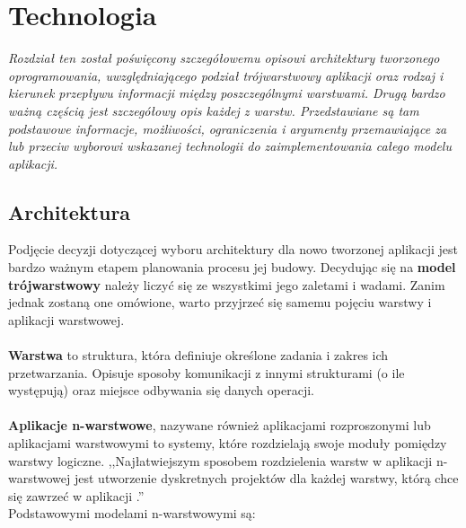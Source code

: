 \chapter{Technologia}
{\em \quad Rozdział ten został poświęcony szczegółowemu opisowi architektury tworzonego oprogramowania, uwzględniającego podział trójwarstwowy aplikacji oraz rodzaj i kierunek przepływu informacji między poszczególnymi warstwami. Drugą bardzo ważną częścią jest szczegółowy opis każdej z warstw. Przedstawiane są tam podstawowe informacje, możliwości, ograniczenia i argumenty przemawiające za lub przeciw wyborowi wskazanej technologii do zaimplementowania całego modelu aplikacji.}

\section{Architektura}
\quad Podjęcie decyzji dotyczącej wyboru architektury dla nowo tworzonej aplikacji jest bardzo ważnym etapem planowania procesu jej budowy. 
Decydując się na \textbf{model trójwarstwowy} należy liczyć się ze wszystkimi jego zaletami i wadami. Zanim jednak zostaną one omówione, warto przyjrzeć się samemu pojęciu warstwy i aplikacji warstwowej.\\
\\
\textbf{Warstwa} to struktura, która definiuje określone zadania i zakres ich przetwarzania. Opisuje sposoby komunikacji z innymi strukturami (o ile występują) oraz miejsce odbywania się danych operacji.\\
\\
\textbf{Aplikacje n-warstwowe}, nazywane również aplikacjami rozproszonymi lub aplikacjami warstwowymi to systemy, które rozdzielają swoje moduły pomiędzy warstwy logiczne. ,,Najłatwiejszym sposobem rozdzielenia warstw w aplikacji n-warstwowej jest utworzenie dyskretnych projektów dla każdej warstwy, którą chce się zawrzeć w aplikacji \cite{tier-applications}.''\\
Podstawowymi modelami n-warstwowymi są:
